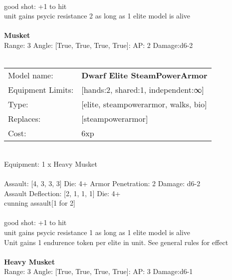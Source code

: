 \ \\
good shot: +1 to hit\\ 
unit gains psycic resistance 2 as long as 1 elite model is alive\\ 

\ \\
{\bf Musket } \\



Range: 3  Angle: [True, True, True, True]: AP: 2 Damage:d6-2 \\




 
\ \\

\noindent
\begin{tabular}{ll}
Model name: &{\bf Dwarf Elite SteamPowerArmor } \\
Equipment Limits: &[hands:2, shared:1, independent:∞] \\
Type: &[elite, steampowerarmor, walks, bio] \\
Replaces: &[steampowerarmor] \\
Cost: & 6xp\\
\end{tabular}
\ \\
Equipment: 1 x Heavy Musket \\
\ \\
Assault: [4, 3, 3, 3] Die: 4+ Armor Penetration: 2 Damage: d6-2 \\
Assault Deflection: [2, 1, 1, 1] Die: 4+\\
\indent cunning assault[1 for 2]\\ 
 
\ \\
good shot: +1 to hit\\ 
unit gains psycic resistance 1 as long as 1 elite model is alive\\ 
Unit gains 1 endurence token per elite in unit. See general rules for effect\\ 

\ \\
{\bf Heavy Musket } \\



Range: 3  Angle: [True, True, True, True]: AP: 3 Damage:d6-1 \\




 
\ \\

